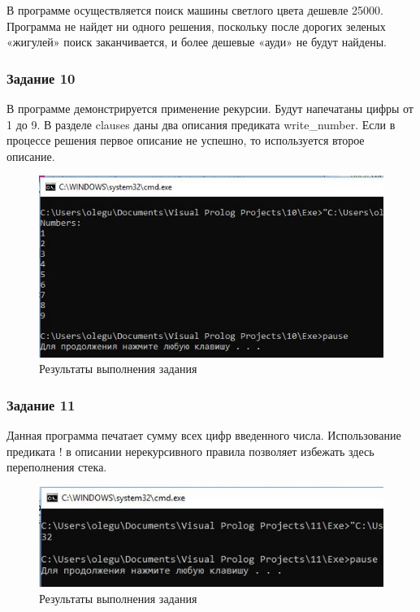 \documentclass[14pt,a4paper,report]{report}
\begin{document}
В программе осуществляется поиск машины светлого цвета дешевле 25000. Программа не найдет ни одного решения, поскольку после дорогих зеленых «жигулей» поиск заканчивается, и более дешевые «ауди» не будут найдены.



\clearpage
\subsubsection{Задание 10}

В программе демонстрируется применение рекурсии. Будут напечатаны цифры от 1 до 9. В разделе clauses даны два описания предиката write\_number. Если в процессе решения первое описание не успешно, то используется второе описание.



\begin{figure}[h!]
	\centering
	\includegraphics[scale = 0.9]{images/d10.png}
	\caption{Результаты выполнения задания}
\end{figure}
\clearpage
\subsubsection{Задание 11}

Данная программа печатает сумму всех цифр введенного числа. Использование предиката ! в описании нерекурсивного правила позволяет избежать здесь переполнения стека.



\begin{figure}[h!]
	\centering
	\includegraphics[scale = 0.9]{images/d11.png}
	\caption{Результаты выполнения задания}
\end{figure}
\clearpage
\end{document}
